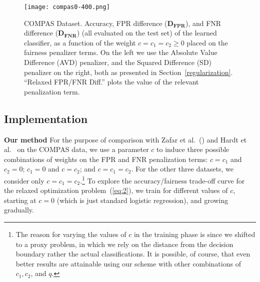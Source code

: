 \begin{figure*}[b]
  \texttt{[image: compas0-400.png]}
  \caption{COMPAS Dataset. Accuracy, FPR difference ($\mathbf{D_{FPR}}$), and FNR difference ($\mathbf{D_{FNR}}$) (all evaluated on the test set) of the learned classifier, as a function of the weight $c=c_1 = c_2 \geq 0$ placed on the fairness penalizer terms. On the left we use the Absolute Value Difference (AVD) penalizer, and the Squared Difference (SD) penalizer on the right, both as presented in Section~\ref{regularization}. ``Relaxed FPR/FNR Diff.'' plots the value of the relevant penalization term.} %
  \label{fig:compas}
\end{figure*}


\subsection{Implementation}
\textbf{Our method} 
For the purpose of comparison with  Zafar et al.~(\citeyear{disparatemistreatment}) and Hardt et al.~\cite{hardt} on the COMPAS data, we use a parameter $c$ to induce three possible combinations of weights on the FPR and FNR penalization terms: $c = c_1$ and $c_2 = 0$; $c_1 = 0$ and $c = c_2$; and $c = c_1 = c_2$. For the other three datasets, we consider only $c = c_1 = c_2$.\footnote{The reason for varying the values of $c$ in the training phase is since we shifted to a proxy problem, in which we rely on the distance from the decision boundary rather the actual classifications. 
It is possible, of course, that even better results are attainable using our scheme with other combinations of $c_1, c_2$, and $q$.} To explore the accuracy/fairness trade-off curve for the relaxed optimization problem~(\ref{eq:2}), we train for different values of $c$, starting at $c=0$ (which is just standard logistic regression), and growing gradually.




